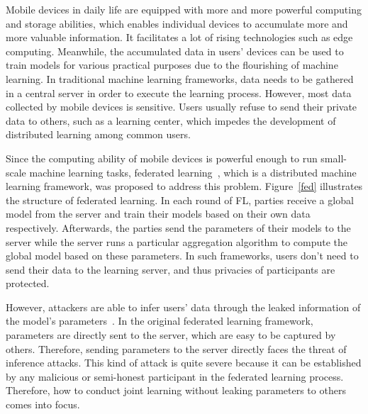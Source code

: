 Mobile devices in daily life are equipped with more and more powerful computing and storage abilities, which enables individual devices to accumulate more and more valuable information. It facilitates a lot of rising technologies such as edge computing. Meanwhile, the accumulated data in users' devices can be used to train models for various practical purposes due to the flourishing of machine learning. In traditional machine learning frameworks, data needs to be gathered in a central server in order to execute the learning process. However, most data collected by mobile devices is sensitive. Users usually refuse to send their private data to others, such as a learning center, which impedes the development of distributed learning among common users.

Since the computing ability of mobile devices is powerful enough to run small-scale machine learning tasks, federated learning~\cite{mcmahan2016communicationefficient}, which is a distributed machine learning framework, was proposed to address this problem. Figure~\ref{fed} illustrates the structure of federated learning. In each round of FL, parties receive a global model from the server and train their models based on their own data respectively. Afterwards, the parties send the parameters of their models to the server while the server runs a particular aggregation algorithm to compute the global model based on these parameters. In such frameworks, users don't need to send their data to the learning server, and thus privacies of participants are protected.

However, attackers are able to infer users' data through the leaked information of the model's parameters~\cite{Beyond, Leakage, Nasr19}. In the original federated learning framework, parameters are directly sent to the server, which are easy to be captured by others. Therefore, sending parameters to the server directly faces the threat of inference attacks. This kind of attack is quite severe because it can be established by any malicious or semi-honest participant in the federated learning process. Therefore, how to conduct joint learning without leaking parameters to others comes into focus.


